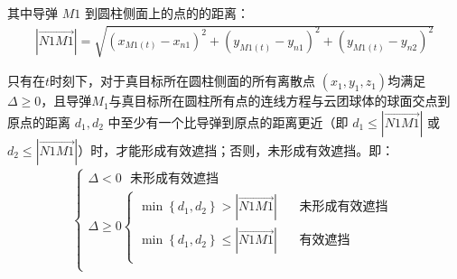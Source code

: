 \documentclass[../main.tex]{subfiles}
\begin{document}
\par 其中导弹 \( M1 \) 到圆柱侧面上的点的的距离：
\begin{align}\label{1.18}
	\left| \overrightarrow{N1M1} \right|=\sqrt{\left( x_{M1(t)}-x_{n1} \right) ^2+\left( y_{M1(t)}-y_{n1} \right) ^2+\left( y_{M1(t)}-y_{n2} \right) ^2}
\end{align}
\par 只有在$t$时刻下，对于真目标所在圆柱侧面的所有离散点 \( (x_1, y_1, z_1) \)均满足 \( \Delta \geq 0 \)，且导弹$M_1$与真目标所在圆柱所有点的连线方程与云团球体的球面交点到原点的距离 \( d_1, d_2 \) 中至少有一个比导弹到原点的距离更近（即 \( d_1 \leq \left| \overrightarrow{N1M1} \right| \) 或 \( d_2 \leq \left| \overrightarrow{N1M1} \right| \)）时，才能形成有效遮挡；否则，未形成有效遮挡。即：
\begin{align}\label{1.19}
	\left\{ \begin{array}{l}
	\varDelta <0\ \ \ \text{未形成有效遮挡}\\
	\varDelta \ge 0\left\{ \begin{array}{l}
	\min \left\{ d_1,d_2 \right\} >\left| \overrightarrow{N1M1} \right|\ \ \ \ \ \ \ \ \text{未形成有效遮挡}\\
	\min \left\{ d_1,d_2 \right\} \le \left| \overrightarrow{N1M1} \right|\ \ \ \ \ \ \ \ \text{有效遮挡}\\
\end{array} \right.\\
\end{array} \right. 
\end{align}
\end{document}
